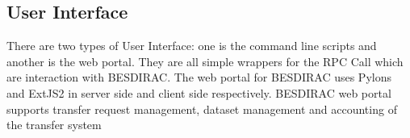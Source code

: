 \subsection{User Interface}
There are two types of User Interface: one is the command line scripts and 
another is the web portal. 
They are all simple wrappers for the RPC Call which are interaction
with BESDIRAC.
The web portal for BESDIRAC uses Pylons and ExtJS2 in server side and
client side respectively. BESDIRAC web portal supports
transfer request management, dataset management and  
accounting of the transfer system
